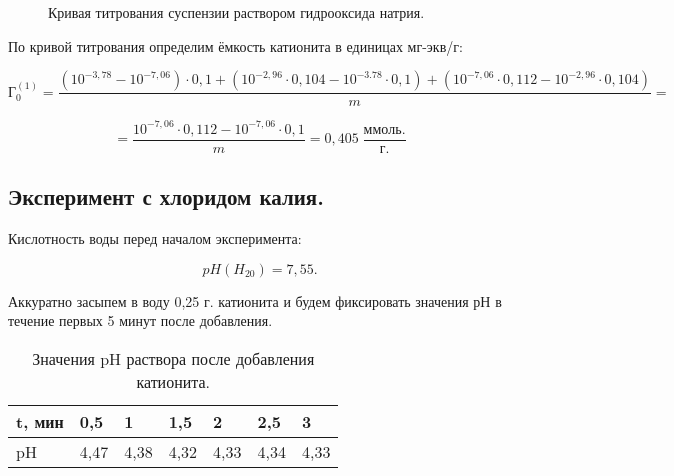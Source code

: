 \documentclass[a4paper,12pt]{article} %
\begin{document}
\begin{figure}[H]
    \centering
    \caption{Кривая титрования суспензии раствором гидрооксида натрия.}
\end{figure}

По кривой титрования определим ёмкость катионита в единицах мг-экв/г:

\begin{equation*}
      \textit{Г}_0^{(1)} = \frac{(10^{-3,78}-10^{-7,06}) \cdot 0,1 + (10^{-2,96} \cdot 0,104 - 10^{-3.78}\cdot 0,1 ) + (10^{-7,06} \cdot 0,112 - 10^{-2,96} \cdot 0,104)} {m} = 
\end{equation*}

\begin{equation*}
     = \frac{10^{-7,06} \cdot 0,112 - 10^{-7,06} \cdot 0,1 }{m} = 0,405 \; \frac{ммоль.}{г.}
\end{equation*} 

\subsection{Эксперимент с хлоридом калия.}

Кислотность воды перед началом эксперимента:

\begin{equation*}
    pH (H_20)= 7,55.
\end{equation*}

Аккуратно засыпем в воду 0,25 г. катионита и будем фиксировать значения рН в течение первых 5 минут после добавления.

\begin{table}[H]
    \centering
    \begin{tabular}{|l|l|l|l|l|l|l|}
    \hline
        t, мин & 0,5 & 1 & 1,5 & 2 & 2,5 & 3 \\ \hline
        pH & 4,47 & 4,38 & 4,32 & 4,33 & 4,34 & 4,33 \\ \hline
    \end{tabular}
     \caption{Значения pH раствора после добавления катионита.}
	\label{tab:my-table1}
\end{table}
\end{document}
